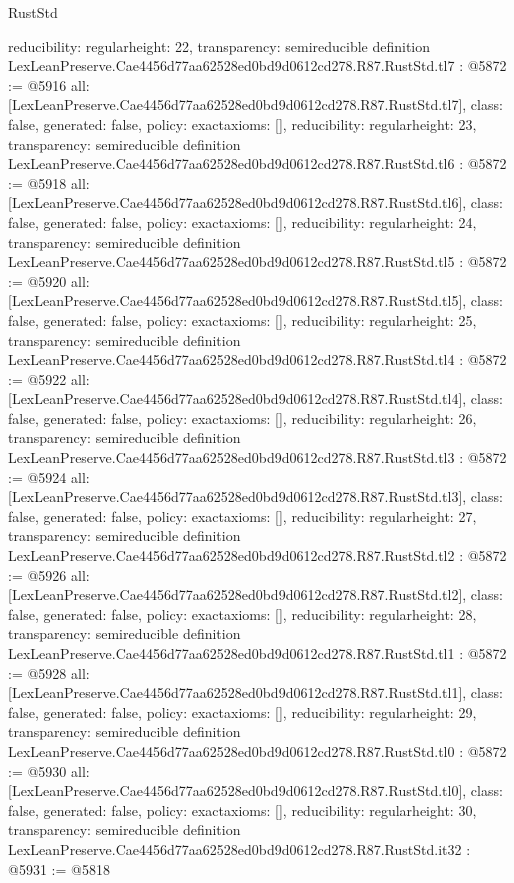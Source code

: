 \begin{lexlean}{RustStd}
\begin{coremodule}
{  reducibility: regular{height: 22},
  transparency: semireducible
}
definition LexLeanPreserve.Cae4456d77aa62528ed0bd9d0612cd278.R87.RustStd.tl7 : @5872 := @5916 {
  all: [LexLeanPreserve.Cae4456d77aa62528ed0bd9d0612cd278.R87.RustStd.tl7],
  class: false,
  generated: false,
  policy: exact{axioms: []},
  reducibility: regular{height: 23},
  transparency: semireducible
}
definition LexLeanPreserve.Cae4456d77aa62528ed0bd9d0612cd278.R87.RustStd.tl6 : @5872 := @5918 {
  all: [LexLeanPreserve.Cae4456d77aa62528ed0bd9d0612cd278.R87.RustStd.tl6],
  class: false,
  generated: false,
  policy: exact{axioms: []},
  reducibility: regular{height: 24},
  transparency: semireducible
}
definition LexLeanPreserve.Cae4456d77aa62528ed0bd9d0612cd278.R87.RustStd.tl5 : @5872 := @5920 {
  all: [LexLeanPreserve.Cae4456d77aa62528ed0bd9d0612cd278.R87.RustStd.tl5],
  class: false,
  generated: false,
  policy: exact{axioms: []},
  reducibility: regular{height: 25},
  transparency: semireducible
}
definition LexLeanPreserve.Cae4456d77aa62528ed0bd9d0612cd278.R87.RustStd.tl4 : @5872 := @5922 {
  all: [LexLeanPreserve.Cae4456d77aa62528ed0bd9d0612cd278.R87.RustStd.tl4],
  class: false,
  generated: false,
  policy: exact{axioms: []},
  reducibility: regular{height: 26},
  transparency: semireducible
}
definition LexLeanPreserve.Cae4456d77aa62528ed0bd9d0612cd278.R87.RustStd.tl3 : @5872 := @5924 {
  all: [LexLeanPreserve.Cae4456d77aa62528ed0bd9d0612cd278.R87.RustStd.tl3],
  class: false,
  generated: false,
  policy: exact{axioms: []},
  reducibility: regular{height: 27},
  transparency: semireducible
}
definition LexLeanPreserve.Cae4456d77aa62528ed0bd9d0612cd278.R87.RustStd.tl2 : @5872 := @5926 {
  all: [LexLeanPreserve.Cae4456d77aa62528ed0bd9d0612cd278.R87.RustStd.tl2],
  class: false,
  generated: false,
  policy: exact{axioms: []},
  reducibility: regular{height: 28},
  transparency: semireducible
}
definition LexLeanPreserve.Cae4456d77aa62528ed0bd9d0612cd278.R87.RustStd.tl1 : @5872 := @5928 {
  all: [LexLeanPreserve.Cae4456d77aa62528ed0bd9d0612cd278.R87.RustStd.tl1],
  class: false,
  generated: false,
  policy: exact{axioms: []},
  reducibility: regular{height: 29},
  transparency: semireducible
}
definition LexLeanPreserve.Cae4456d77aa62528ed0bd9d0612cd278.R87.RustStd.tl0 : @5872 := @5930 {
  all: [LexLeanPreserve.Cae4456d77aa62528ed0bd9d0612cd278.R87.RustStd.tl0],
  class: false,
  generated: false,
  policy: exact{axioms: []},
  reducibility: regular{height: 30},
  transparency: semireducible
}
definition LexLeanPreserve.Cae4456d77aa62528ed0bd9d0612cd278.R87.RustStd.it32 : @5931 := @5818 {
}
\end{coremodule}
\end{lexlean}
